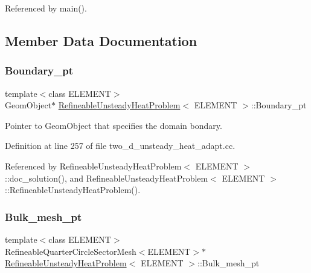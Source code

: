 Referenced by main().



\subsection{Member Data Documentation}
\mbox{\label{classRefineableUnsteadyHeatProblem_a368512778fbfd59e918104340466b1df}} 
\subsubsection{\texorpdfstring{Boundary\+\_\+pt}{Boundary\_pt}}
{\footnotesize\ttfamily template$<$class E\+L\+E\+M\+E\+NT$>$ \\
Geom\+Object$\ast$ \hyperlink{classRefineableUnsteadyHeatProblem}{Refineable\+Unsteady\+Heat\+Problem}$<$ E\+L\+E\+M\+E\+NT $>$\+::Boundary\+\_\+pt\hspace{0.3cm}{\ttfamily [private]}}



Pointer to Geom\+Object that specifies the domain bondary. 



Definition at line 257 of file two\+\_\+d\+\_\+unsteady\+\_\+heat\+\_\+adapt.\+cc.



Referenced by Refineable\+Unsteady\+Heat\+Problem$<$ E\+L\+E\+M\+E\+N\+T $>$\+::doc\+\_\+solution(), and Refineable\+Unsteady\+Heat\+Problem$<$ E\+L\+E\+M\+E\+N\+T $>$\+::\+Refineable\+Unsteady\+Heat\+Problem().

\mbox{\label{classRefineableUnsteadyHeatProblem_afade341e03a4c97e62444c80adc9552f}} 
\subsubsection{\texorpdfstring{Bulk\+\_\+mesh\+\_\+pt}{Bulk\_mesh\_pt}}
{\footnotesize\ttfamily template$<$class E\+L\+E\+M\+E\+NT$>$ \\
Refineable\+Quarter\+Circle\+Sector\+Mesh$<$E\+L\+E\+M\+E\+NT$>$$\ast$ \hyperlink{classRefineableUnsteadyHeatProblem}{Refineable\+Unsteady\+Heat\+Problem}$<$ E\+L\+E\+M\+E\+NT $>$\+::Bulk\+\_\+mesh\+\_\+pt\hspace{0.3cm}{\ttfamily [private]}}



